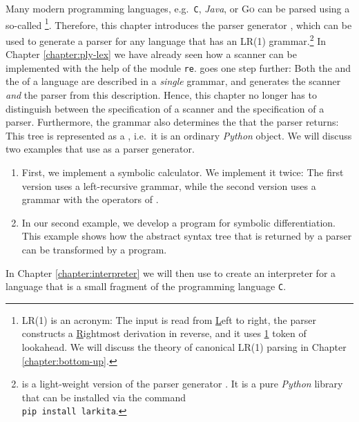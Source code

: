 Many modern programming languages, e.g.~\texttt{C}, \textsl{Java}, or \textsc{Go} can
be parsed using a so-called \footnote{
  LR(1) is an acronym:  The input is read from \underline{L}eft to right, the parser constructs a
  \underline{R}ightmost derivation in reverse, and it uses \underline{1} token of lookahead.
  We will discuss the theory of canonical LR(1) parsing in Chapter \ref{chapter:bottom-up}.}.
Therefore, this chapter introduces the parser generator
\href{https://github.com/karlstroetmann/Larkita}{}, which can
be used to generate a parser for any language that has an LR(1) grammar.\footnote{
   is a light-weight version of the parser generator
  \href{https://lark-parser.readthedocs.io/}{}.  It is a pure \textsl{Python} library that can
  be installed via the command
  \\[0.1cm]
  \hspace*{1.3cm}
  \textcolor{amethyst}{\texttt{pip install larkita}}.}
In Chapter \ref{chapter:ply-lex} we have already seen how a scanner can be implemented with the help of the
module \texttt{re}.   goes one step further:  Both the  and the
 of a language are described in a \emph{single} grammar, and 
generates the scanner \emph{and} the parser from this description.  Hence, this chapter no longer has to
distinguish between the specification of a scanner and the specification of a parser.  Furthermore, the
grammar also determines the  that the parser returns:  This tree is represented as a
, i.e.~it is an ordinary \textsl{Python} object.
We will discuss two examples that use  as a parser generator.
\begin{enumerate}
\item First, we implement a symbolic calculator.  We implement it twice:  The first version uses a
      left-recursive grammar, while the second version uses a grammar with the operators of .
\item In our second example, we develop a program for symbolic differentiation.
      This example shows how the abstract syntax tree that is returned by a parser can be transformed by a
      program.
\end{enumerate}
In Chapter \ref{chapter:interpreter} we will then use  to create an interpreter for a language
that is a small fragment of the programming language \texttt{C}.

